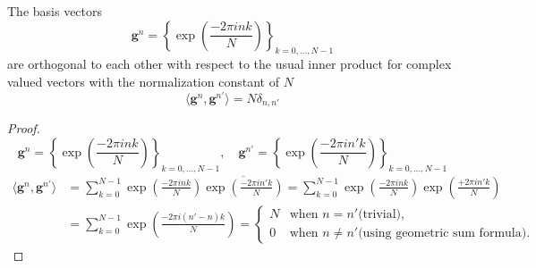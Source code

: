 \begin{Prop}\label{Prop:1ddftbasisvectors}
    The basis vectors
    \begin{equation}\label{eq:1ddftbasisvectors}
        \boldsymbol{g}^n = \left\{\exp\left({\frac{-2\pi ink}{N}}\right)\right\}_{k=0,\ldots,N-1}
    \end{equation}
    are orthogonal to each other with respect to the usual inner product for complex valued vectors 
    with the normalization constant of $N$
    \begin{equation}
        \langle\boldsymbol{g}^n,\boldsymbol{g}^{n'}\rangle= N \delta_{n,n'}
    \end{equation}
\end{Prop}

\begin{proof}
    \begin{equation*}
        \boldsymbol{g}^n = \left\{\exp\left({\frac{-2\pi ink}{N}}\right)\right\}_{k=0,\ldots,N-1}, \quad \boldsymbol{g}^{n'} = \left\{\exp\left({\frac{-2\pi in'k}{N}}\right)\right\}_{k=0,\ldots,N-1}
    \end{equation*}
    \begin{equation*}
    \begin{split} 
        \langle\boldsymbol{g}^n,\boldsymbol{g}^{n'}\rangle &= \sum_{k=0}^{N-1} \exp\left({\frac{-2\pi ink}{N}}\right)\overline{\exp\left({\frac{-2\pi in'k}{N}}\right)}
        = \sum_{k=0}^{N-1} \exp\left({\frac{-2\pi ink}{N}}\right)\exp\left({\frac{+2\pi in'k}{N}}\right)\\
        &= \sum_{k=0}^{N-1} \exp\left({\frac{-2\pi i(n'-n)k}{N}}\right)=
        \begin{cases}
            N & \text{when $n = n'$}\text{(trivial)},\\
            0 & \text{when $n\neq n'$}\text{(using geometric sum formula)}.
        \end{cases}
    \end{split}
\end{equation*}
    
\end{proof}


